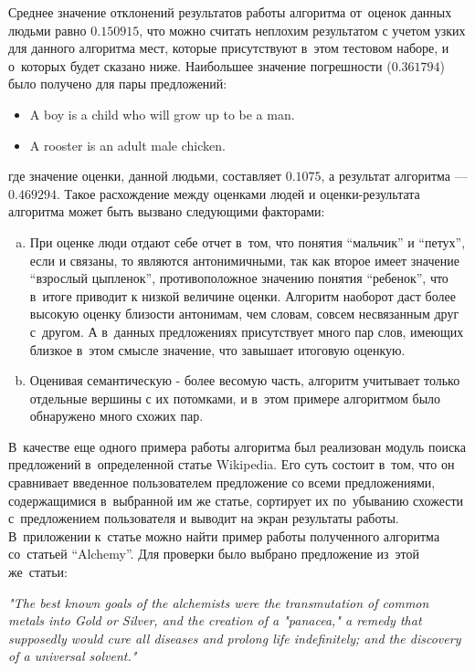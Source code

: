 Среднее значение отклонений результатов работы алгоритма от~оценок данных людьми равно $0.150915$,
что можно считать неплохим результатом с учетом узких для данного алгоритма мест,
которые присутствуют в~этом тестовом наборе, и о~которых будет сказано ниже. 
Наибольшее значение погрешности ($0.361794$) было получено для пары предложений:
\begin{itemize}
\item {
	A boy is a child who will grow up to be a man.
}
\item {
	A rooster is an adult male chicken.
}
\end{itemize}
где значение оценки, данной людьми, составляет $0.1075$, а результат алгоритма --- $0.469294$.
Такое расхождение между оценками людей и оценки-результата алгоритма может быть вызвано
следующими факторами:
\begin{enumerate}[a.]
\item {
При оценке люди отдают себе отчет в~том, что понятия ``мальчик'' и ``петух'', если и связаны,
то являются антонимичными, так как второе имеет значение ``взрослый цыпленок'', противоположное
значению понятия ``ребенок'', что в~итоге приводит к низкой величине оценки. 
Алгоритм наоборот даст более высокую оценку близости антонимам, чем словам,
совсем несвязанным друг с~другом. А в~данных предложениях присутствует
много пар слов, имеющих близкое в~этом смысле значение, что завышает итоговую оценкую.
}
\item {
Оценивая семантическую - более весомую часть, алгоритм учитывает только отдельные вершины
с их потомками, и в~этом примере алгоритмом было обнаружено много схожих пар.
}
\end{enumerate}

В~качестве еще одного примера работы алгоритма был реализован
модуль поиска предложений в~определенной статье Wikipedia.
Его суть состоит в~том, что он сравнивает введенное пользователем предложение
со всеми предложениями, содержащимися в~выбранной им же статье, сортирует их по~убыванию
схожести с~предложением пользователя и выводит на экран результаты работы.
В~приложении к~статье можно найти пример работы полученного алгоритма со~статьей ``Alchemy''.
Для проверки было выбрано предложение из~этой же~статьи:

\textit{"The best known goals of the alchemists were the transmutation of common metals into Gold or Silver, and the creation of a "panacea," a remedy that supposedly would cure all diseases and prolong life indefinitely; and the discovery of a universal solvent."}

